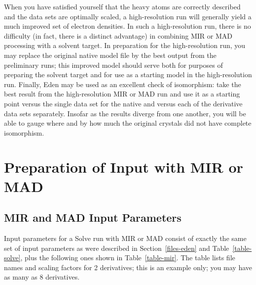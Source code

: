 \documentclass{report}
\begin{document}
When you have satisfied yourself that the
heavy atoms are correctly described and the data sets are optimally scaled,
a high-resolution run will generally yield a much improved set of
electron densities.  In such a high-resolution run, there is no difficulty 
(in fact, there is a distinct advantage) in combining MIR or MAD processing 
with a solvent target.  In preparation for the high-resolution run,
you may replace the original native model file by the best output
from the preliminary runs;
this improved model should serve
both for purposes of preparing the solvent target and 
for use as a starting model in the high-resolution run.
Finally, Eden may be used as an excellent check of isomorphism: 
take the best result from the high-resolution MIR or MAD run and 
use it as a starting point versus the single data set for the native and 
versus each of the derivative data sets separately.  
Insofar as the results diverge from one
another, you will be able to gauge where and by how much 
the original crystals did not have complete isomorphism.

\section {Preparation of Input with MIR or MAD}
\label{mir-preparation}

\subsection {MIR and MAD Input Parameters}
\label{mir-preparation-input}

Input parameters for a Solve run with MIR or MAD consist of exactly the same
set of input parameters as were described in Section~\ref{files-eden}
and Table~\ref{table-solve},
plus the following ones shown in Table~\ref{table-mir}.
The table lists file names and scaling factors for 2 derivatives; this is
an example only; you may have as many as 8 derivatives.
\end{document}
